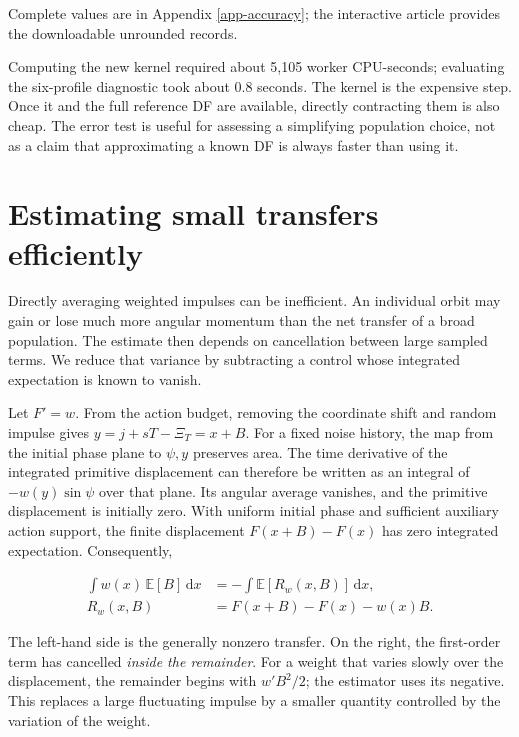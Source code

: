 \documentclass[fleqn,usenatbib]{mnras}
\begin{document}
Complete values are in Appendix \ref{app-accuracy}; the interactive article provides the downloadable unrounded records.

Computing the new kernel required about 5,105 worker CPU-seconds; evaluating the six-profile diagnostic took about 0.8 seconds. The kernel is the expensive step. Once it and the full reference DF are available, directly contracting them is also cheap. The error test is useful for assessing a simplifying population choice, not as a claim that approximating a known DF is always faster than using it.

\section{Estimating small transfers efficiently}\label{estimator}

Directly averaging weighted impulses can be inefficient. An individual orbit may gain or lose much more angular momentum than the net transfer of a broad population. The estimate then depends on cancellation between large sampled terms. We reduce that variance by subtracting a control whose integrated expectation is known to vanish.

Let \(F'=w\). From the action budget, removing the coordinate shift and random impulse gives \(y=j+sT-\Xi_T=x+B\). For a fixed noise history, the map from the initial phase plane to \(\psi,y\) preserves area. The time derivative of the integrated primitive displacement can therefore be written as an integral of \(-w(y)\sin\psi\) over that plane. Its angular average vanishes, and the primitive displacement is initially zero. With uniform initial phase and sufficient auxiliary action support, the finite displacement \(F(x+B)-F(x)\) has zero integrated expectation. Consequently,

\begin{equation}\label{EQ-EST-01}
\begin{aligned}
\int w(x)\,\mathbb E[B]\,\mathrm dx
&=-\int\mathbb E\!\left[R_w(x,B)\right]\,\mathrm dx,\\
R_w(x,B)&=F(x+B)-F(x)-w(x)B.
\end{aligned}
\end{equation}

The left-hand side is the generally nonzero transfer. On the right, the first-order term has cancelled \emph{inside the remainder}. For a weight that varies slowly over the displacement, the remainder begins with \(w'B^2/2\); the estimator uses its negative. This replaces a large fluctuating impulse by a smaller quantity controlled by the variation of the weight.
\end{document}
